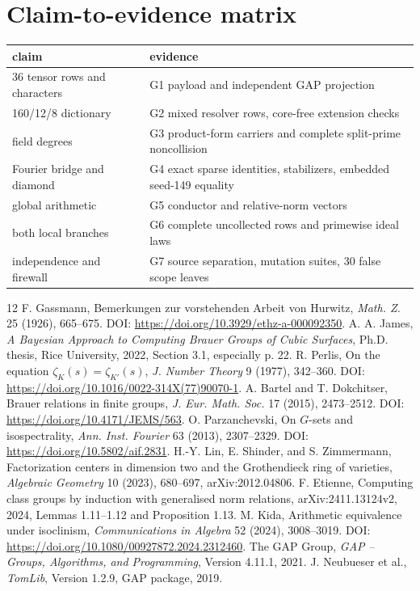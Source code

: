 \documentclass[11pt]{article}
\begin{document}
\appendix
\section{Claim-to-evidence matrix}
\begin{center}\small
\begin{tabularx}{\textwidth}{@{}lX@{}}\toprule claim&evidence\\\midrule
36 tensor rows and characters&G1 payload and independent GAP projection\\
160/12/8 dictionary&G2 mixed resolver rows, core-free extension checks\\
field degrees&G3 product-form carriers and complete split-prime noncollision\\
Fourier bridge and diamond&G4 exact sparse identities, stabilizers, embedded seed-149 equality\\
global arithmetic&G5 conductor and relative-norm vectors\\
both local branches&G6 complete uncollected rows and primewise ideal laws\\
independence and firewall&G7 source separation, mutation suites, 30 false scope leaves\\\bottomrule
\end{tabularx}\end{center}


\begin{thebibliography}{12}
 F. Gassmann, Bemerkungen zur vorstehenden Arbeit von Hurwitz,
\emph{Math. Z.} 25 (1926), 665--675. DOI: \url{https://doi.org/10.3929/ethz-a-000092350}.
 A. A. James, \emph{A Bayesian Approach to Computing Brauer Groups of Cubic Surfaces}, Ph.D. thesis, Rice University, 2022, Section 3.1, especially p. 22.
 R. Perlis, On the equation $\zeta_K(s)=\zeta_{K'}(s)$,
\emph{J. Number Theory} 9 (1977), 342--360. DOI: \url{https://doi.org/10.1016/0022-314X(77)90070-1}.
 A. Bartel and T. Dokchitser, Brauer relations in finite groups,
\emph{J. Eur. Math. Soc.} 17 (2015), 2473--2512. DOI: \url{https://doi.org/10.4171/JEMS/563}.
 O. Parzanchevski, On $G$-sets and isospectrality,
\emph{Ann. Inst. Fourier} 63 (2013), 2307--2329. DOI: \url{https://doi.org/10.5802/aif.2831}.
 H.-Y. Lin, E. Shinder, and S. Zimmermann, Factorization centers in dimension two and the Grothendieck ring of varieties, \emph{Algebraic Geometry} 10 (2023), 680--697, arXiv:2012.04806.
 F. Etienne, Computing class groups by induction with generalised norm relations,
arXiv:2411.13124v2, 2024, Lemmas 1.11--1.12 and Proposition 1.13.
 M. Kida, Arithmetic equivalence under isoclinism,
\emph{Communications in Algebra} 52 (2024), 3008--3019. DOI: \url{https://doi.org/10.1080/00927872.2024.2312460}.
 The GAP Group, \emph{GAP -- Groups, Algorithms, and Programming}, Version 4.11.1, 2021.
 J. Neubueser et al., \emph{TomLib}, Version 1.2.9, GAP package, 2019.
\end{thebibliography}
\end{document}
